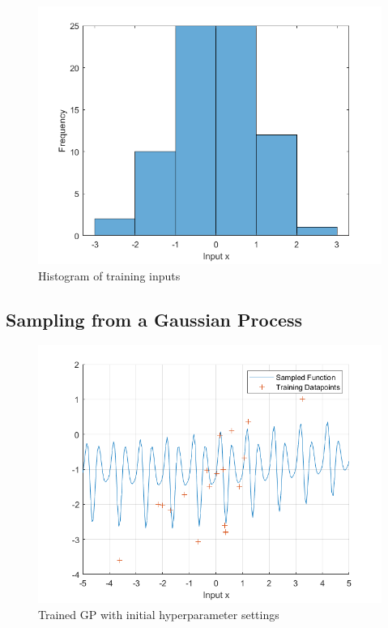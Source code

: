 \documentclass[]{article}
\newcommand{\figwidth}{0.6\linewidth}
\begin{document}
\begin{figure}[!h]
	\centering
	\includegraphics[width=\figwidth]{1c1}
	\caption{Histogram of training inputs}
	\label{fig:1c1}
\end{figure}

\subsection{Sampling from a Gaussian Process}

\begin{figure}[!h]
	\centering
	\includegraphics[width=\figwidth]{1d}
	\caption{Trained GP with initial hyperparameter settings}
	\label{fig:1d}
\end{figure}
\end{document}
